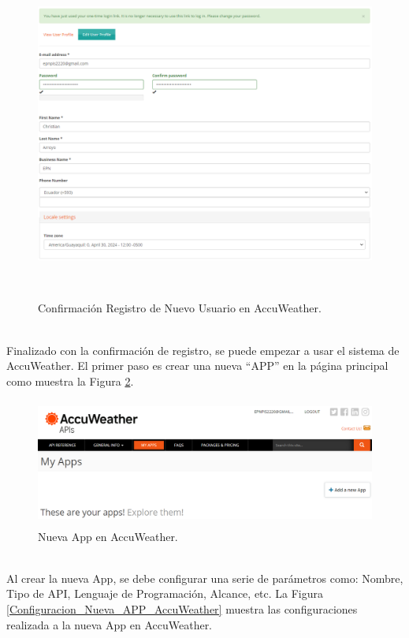 \documentclass[a4paper,10pt, oneside, titlepage]{article}
\begin{document}
	\begin{figure}[!h]
		\centering
		\includegraphics[width = 1\linewidth, height = 11cm]{Confirmacion_Registro_Nuevo_Usuario_AccuWeather.png}
		\caption{Confirmación Registro de Nuevo Usuario en AccuWeather.}
		\label{Confirmacion_Registro_Nuevo_Usuario_AccuWeather}
	\end{figure} \\
	\indent Finalizado con la confirmación de registro, se puede empezar a usar el sistema de AccuWeather. El primer paso es crear una nueva ``APP'' en la página principal como muestra la Figura \ref{Nueva_App_AccuWeather}.
	\begin{figure}[!h]
		\centering
		\includegraphics[width = 1\linewidth, height = 4.2cm]{Nueva_App_AccuWeather.png}
		\caption{Nueva App en AccuWeather.}
		\label{Nueva_App_AccuWeather}
	\end{figure} \\
	\indent Al crear la nueva App, se debe configurar una serie de parámetros como: Nombre, Tipo de API, Lenguaje de Programación, Alcance, etc. La Figura \ref{Configuracion_Nueva_APP_AccuWeather} muestra las configuraciones realizada a la nueva App en AccuWeather.
\end{document}
